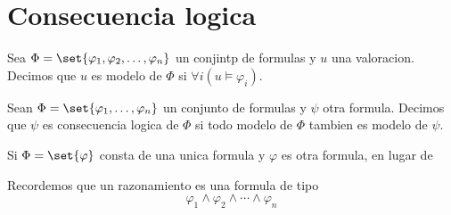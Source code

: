 \section{Consecuencia logica}
\begin{definition}
	Sea \(\Phi = \set{\varphi_1, \varphi_2, \ldots, \varphi_n }\) un conjintp de formulas y \(u \) una valoracion. Decimos que \(u \) es modelo de \(\Phi\) si \(\forall i (u \models \varphi_i )\).
\end{definition}
\begin{definition}
	Sean \(\Phi = \set{\varphi_1, \ldots, \varphi_n }\) un conjunto de formulas y \(\psi \) otra formula. Decimos que \(\psi \) es consecuencia logica de \(\Phi\) si todo modelo de \(\Phi \) tambien es modelo de \(\psi \).
\end{definition}

\begin{remark}
	Si \(\Phi = \set{\varphi}\) consta de una unica formula y \(\varphi\) es otra formula, en lugar de
\end{remark}
\begin{definition}
	Recordemos que un razonamiento es una formula de tipo
	\[
		\varphi_1 \wedge  \varphi_2 \wedge \cdots \wedge \varphi_n
	\]
\end{definition}

